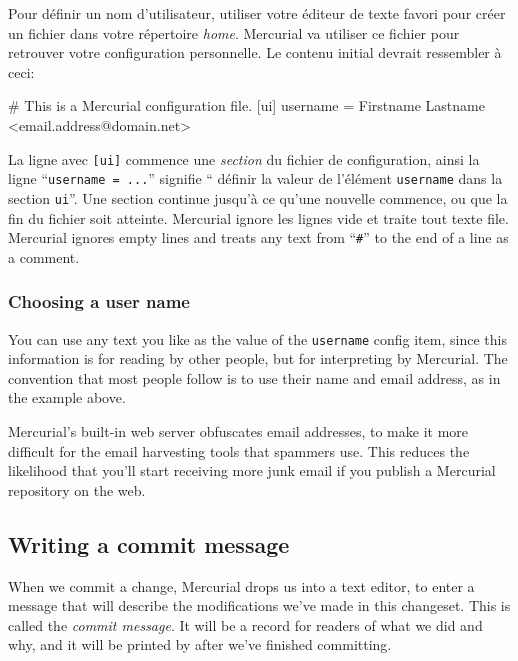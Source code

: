 Pour définir un nom d'utilisateur, utiliser votre éditeur de texte favori
pour créer un fichier  dans votre répertoire \textit{home}.
Mercurial va utiliser ce fichier pour retrouver votre configuration personnelle.
Le contenu initial devrait ressembler à ceci:
\begin{codesample2}
  # This is a Mercurial configuration file.
  [ui]
  username = Firstname Lastname <email.address@domain.net>
\end{codesample2}
La ligne avec \texttt{[ui]} commence une \emph{section} du fichier de
configuration, ainsi la ligne ``\texttt{username = ...}'' signifie ``
définir la valeur de l'élément \texttt{username} dans la section 
\texttt{ui}''. Une section continue jusqu'à ce qu'une nouvelle 
commence, ou que la fin du fichier soit atteinte. Mercurial ignore
les lignes vide et traite tout texte 
file.  Mercurial ignores empty lines and treats any text from
``\texttt{\#}'' to the end of a line as a comment.

\subsubsection{Choosing a user name}

You can use any text you like as the value of the \texttt{username}
config item, since this information is for reading by other people,
but for interpreting by Mercurial.  The convention that most people
follow is to use their name and email address, as in the example
above.

\begin{note}
  Mercurial's built-in web server obfuscates email addresses, to make
  it more difficult for the email harvesting tools that spammers use.
  This reduces the likelihood that you'll start receiving more junk
  email if you publish a Mercurial repository on the web.
\end{note}

\subsection{Writing a commit message}

When we commit a change, Mercurial drops us into a text editor, to
enter a message that will describe the modifications we've made in
this changeset.  This is called the \emph{commit message}.  It will be
a record for readers of what we did and why, and it will be printed by
 after we've finished committing.

